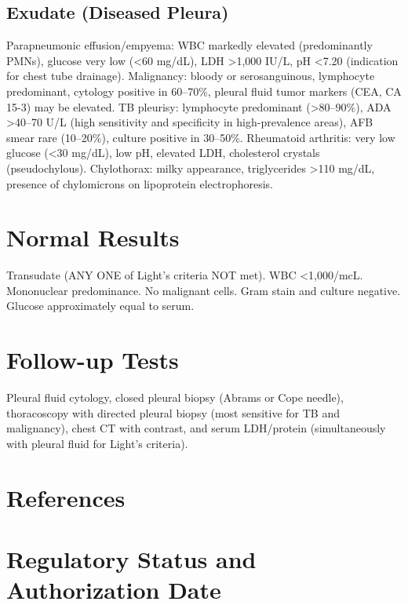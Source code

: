 \subsection*{Exudate (Diseased Pleura)}
Parapneumonic effusion/empyema: WBC markedly elevated (predominantly PMNs), glucose very low (<60 mg/dL), LDH >1,000 IU/L, pH <7.20 (indication for chest tube drainage). Malignancy: bloody or serosanguinous, lymphocyte predominant, cytology positive in 60--70\%, pleural fluid tumor markers (CEA, CA 15-3) may be elevated. TB pleurisy: lymphocyte predominant (>80--90\%), ADA >40--70 U/L (high sensitivity and specificity in high-prevalence areas), AFB smear rare (10--20\%), culture positive in 30--50\%. Rheumatoid arthritis: very low glucose (<30 mg/dL), low pH, elevated LDH, cholesterol crystals (pseudochylous). Chylothorax: milky appearance, triglycerides >110 mg/dL, presence of chylomicrons on lipoprotein electrophoresis.
\section*{Normal Results}
Transudate (ANY ONE of Light's criteria NOT met). WBC <1,000/mcL. Mononuclear predominance. No malignant cells. Gram stain and culture negative. Glucose approximately equal to serum.
\section*{Follow-up Tests}
Pleural fluid cytology, closed pleural biopsy (Abrams or Cope needle), thoracoscopy with directed pleural biopsy (most sensitive for TB and malignancy), chest CT with contrast, and serum LDH/protein (simultaneously with pleural fluid for Light's criteria).
\section*{References}



\clearpage
\section*{Regulatory Status and Authorization Date}

\clearpage
